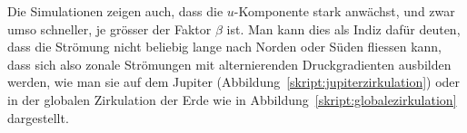 Die Simulationen zeigen auch, dass die $u$-Komponente stark anwächst,
und zwar umso schneller, je grösser der Faktor $\beta$ ist.
Man kann dies als Indiz dafür deuten, dass die Strömung nicht beliebig
lange nach Norden oder Süden fliessen kann, dass sich also zonale
Strömungen mit alternierenden Druckgradienten ausbilden werden, wie man
sie auf dem Jupiter (Abbildung~\ref{skript:jupiterzirkulation}) oder
in der globalen Zirkulation der Erde wie in
Abbildung~\ref{skript:globalezirkulation} dargestellt.


